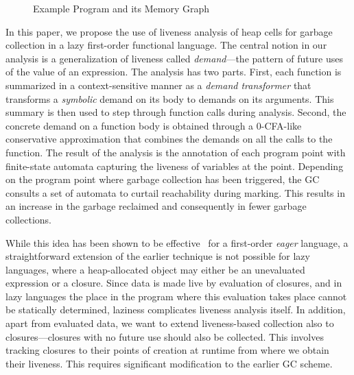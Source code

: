 \documentclass[9pt]{sigplanconf}
\begin{document}
\begin{figure}[t!]
 \vspace*{-3ex}
  \caption{Example Program and its Memory Graph}\label{fig:mot-example}
\end{figure}

In this paper,  we propose the use of liveness  analysis of heap cells
for garbage collection in a lazy first-order functional language.  The
central notion in our analysis  is a generalization of liveness called
{\em  demand}---the  pattern  of  future  uses  of  the  value  of  an
expression.   The analysis  has two  parts.  First,  each  function is
summarized in a context-sensitive manner as a {\em demand transformer}
that transforms a {\em symbolic} demand  on its body to demands on its
arguments.  This summary  is then used to step  through function calls
during analysis.   Second, the concrete  demand on a function  body is
obtained through a 0-CFA-like conservative approximation that combines
the  demands on  all the  calls to  the function.   The result  of the
analysis  is the annotation  of each  program point  with finite-state
automata capturing  the liveness of variables at  the point. Depending
on the program point where  garbage collection has been triggered, the
GC consults  a set of automata  to curtail reachability
during marking.  This results in  an increase in the garbage reclaimed
and consequently in fewer garbage collections.

While this idea has been shown to be effective~\cite{asati14lgc} for a
first-order {\em  eager} language, a straightforward  extension of the
earlier  technique  is  not  possible  for  lazy  languages,  where  a
heap-allocated  object may either  be an  unevaluated expression  or a
closure. Since  data is  made live by  evaluation of closures,  and in
lazy languages  the place in  the program where this  evaluation takes
place cannot  be statically determined,  laziness complicates liveness
analysis itself.  In  addition, apart from evaluated data,  we want to
extend  liveness-based collection also  to closures---closures with no
future use should also  be collected.  This involves tracking closures
to  their points of  creation at  runtime from  where we  obtain their
liveness.  This  requires significant  modification to the  earlier GC
scheme.
\end{document}
